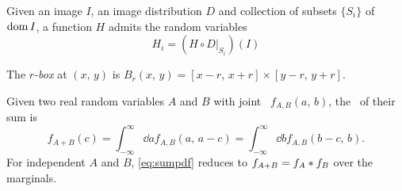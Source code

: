 \documentclass[../notebook.tex]{subfiles}
\begin{document}
\begin{defn}
  Given an image $I$, an image distribution $D$ and collection of subsets
  $\{S_i\}$ of $\operatorname{\mathrm{dom}} I$, a function $H$ admits the random variables
  \[
    H_i
    = (H \circ D|_{S_i})(I)
  \]
\end{defn}

\begin{defn}
  The \emph{$r$-box} at $(x,\, y)$ is $B_r(x,\, y) = [x - r,\, x + r]
  \times [y - r,\, y + r]$. 
\end{defn}

Given two real random variables $A$ and $B$ with joint \pdf\ $f_{A,B}(a,\, b)$,
the \pdf\ of their sum is
\begin{equation}
  f_{A+B}(c)
  = \int_{-\infty}^\infty \dd{a} f_{A,B}(a,\, a-c)
  = \int_{-\infty}^\infty \dd{b} f_{A,B}(b-c,\, b).
  \label{eq:sumpdf}
\end{equation}
For independent $A$ and $B$, \cref{eq:sumpdf} reduces to $f_{A+B} =
f_A \mathbin{*} f_B$ over the marginals.



\end{document}
